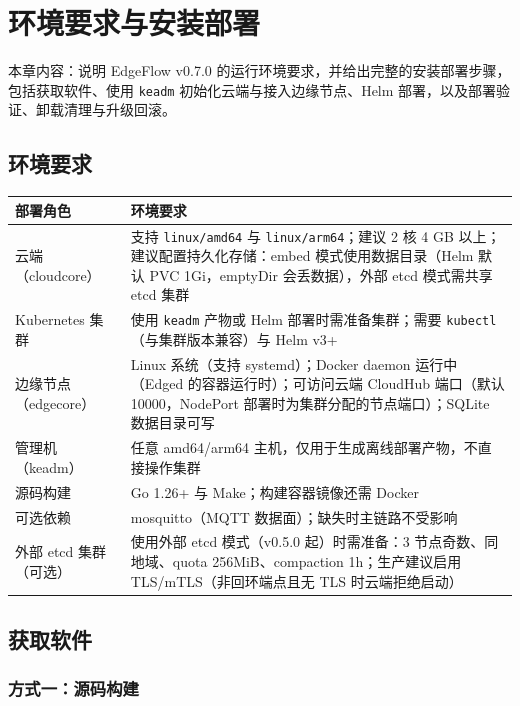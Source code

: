 \chapter{环境要求与安装部署}
\label{ch:2}

本章内容：说明 EdgeFlow v0.7.0 的运行环境要求，并给出完整的安装部署步骤，包括获取软件、使用 \texttt{keadm} 初始化云端与接入边缘节点、Helm 部署，以及部署验证、卸载清理与升级回滚。

\section{环境要求}

\begin{tabularx}{\textwidth}{|l|X|}
  \hline
  \textbf{部署角色} & \textbf{环境要求} \\
  \hline
  云端（cloudcore） & 支持 \texttt{linux/amd64} 与 \texttt{linux/arm64}；建议 2 核 4 GB 以上；建议配置持久化存储：embed 模式使用数据目录（Helm 默认 PVC 1Gi，emptyDir 会丢数据），外部 etcd 模式需共享 etcd 集群 \\
  \hline
  Kubernetes 集群 & 使用 \texttt{keadm} 产物或 Helm 部署时需准备集群；需要 \texttt{kubectl}（与集群版本兼容）与 Helm v3+ \\
  \hline
  边缘节点（edgecore） & Linux 系统（支持 systemd）；Docker daemon 运行中（Edged 的容器运行时）；可访问云端 CloudHub 端口（默认 10000，NodePort 部署时为集群分配的节点端口）；SQLite 数据目录可写 \\
  \hline
  管理机（keadm） & 任意 amd64/arm64 主机，仅用于生成离线部署产物，不直接操作集群 \\
  \hline
  源码构建 & Go 1.26+ 与 Make；构建容器镜像还需 Docker \\
  \hline
  可选依赖 & mosquitto（MQTT 数据面）；缺失时主链路不受影响 \\
  \hline
  外部 etcd 集群（可选） & 使用外部 etcd 模式（v0.5.0 起）时需准备：3 节点奇数、同地域、quota 256MiB、compaction 1h；生产建议启用 TLS/mTLS（非回环端点且无 TLS 时云端拒绝启动） \\
  \hline
\end{tabularx}

\section{获取软件}

\subsection{方式一：源码构建}

